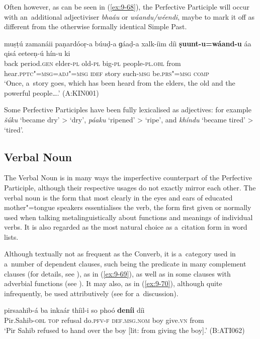 Often however, as can be seen in (\ref{ex:9-68}), the Perfective Participle will occur with an~additional adjectiviser \textit{bhaáu} or \textit{wáandu/wéendi}, maybe to mark it off as different from the otherwise formally identical Simple Past.
\begin{exe}
\ex
\label{ex:9-68}
\gll muṣṭú zamanáii paṇardóoṛ-a búuḍ-a ɡáaḍ-a xalk-íim díi \textbf{ṣuunt-u=wáand-u} áa qisá eeteeṇ-ú hín-u ki\\
back period.\textsc{gen} elder-\textsc{pl} old-\textsc{pl} big-\textsc{pl}  people-\textsc{pl.obl} from hear.\textsc{pptc"=msg=adj"=msg} \textsc{idef} story such-\textsc{msg} be.\textsc{prs"=msg} \textsc{comp} \\
\glt `Once, a~story goes, which has been heard from the elders, the old and the powerful people{\ldots}.'
(A:KIN001)
\end{exe}

Some Perfective Participles have been fully lexicalised as adjectives: for example \textit{šúku} `became dry' {\textgreater} `dry', \textit{páaku} `ripened' {\textgreater} `ripe', and \textit{khíndu} `became tired' {\textgreater} `tired'.


\subsection{Verbal Noun}
\label{subsec:9-3-3}


The Verbal Noun is in many ways the imperfective counterpart of the Perfective Participle, although their respective usages do not exactly mirror each other. The verbal noun is the form that most clearly in the eyes and ears of educated mother"=tongue speakers essentialises the verb, the form first given or normally used when talking metalinguistically about functions and meanings of individual verbs. It is also regarded as the most natural choice as a~citation form in word lists. 


Although textually not as frequent as the Converb, it is a~category used in a~number of dependent clauses, such being the predicate in many complement clauses (for details, see ), as in (\ref{ex:9-69}), as well as in some clauses with adverbial functions (see ). It may also, as in (\ref{ex:9-70}), although quite infrequently, be used attributively (see  for a~discussion).

\begin{exe}
\ex
\label{ex:9-69}
\gll pirsaahib-á ba inkaár thíil-i so phoó \textbf{deníi} díi \\
Pir.Sahib-\textsc{obl} \textsc{top} refusal do.\textsc{pfv-f} \textsc{def.msg.nom} boy give.\textsc{vn} from \\
\glt `Pir Sahib refused to hand over the boy [lit: from giving the boy].' (B:ATI062)
\end{exe}

